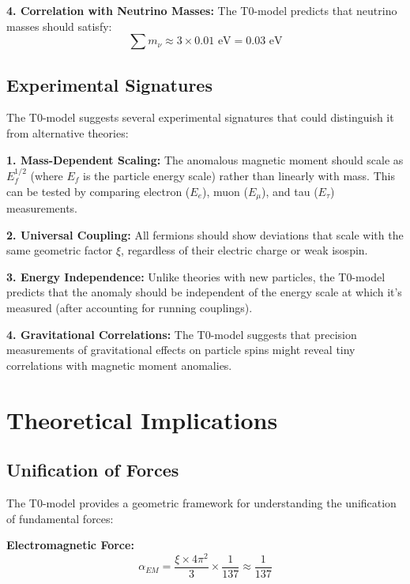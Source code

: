 \documentclass[12pt,a4paper]{article}
\newcommand{\xigeom}{\xi}
\newcommand{\Ee}{E_e}
\newcommand{\Emu}{E_{\mu}}
\begin{document}
	\textbf{4. Correlation with Neutrino Masses:}
	The T0-model predicts that neutrino masses should satisfy:
	\begin{equation}
		\sum m_\nu \approx 3 \times 0.01 \text{ eV} = 0.03 \text{ eV}
	\end{equation}
	
	\subsection{Experimental Signatures}
	
	The T0-model suggests several experimental signatures that could distinguish it from alternative theories:
	
	\textbf{1. Mass-Dependent Scaling:}
	The anomalous magnetic moment should scale as $E_f^{1/2}$ (where $E_f$ is the particle energy scale) rather than linearly with mass. This can be tested by comparing electron ($\Ee$), muon ($\Emu$), and tau ($E_\tau$) measurements.
	
	\textbf{2. Universal Coupling:}
	All fermions should show deviations that scale with the same geometric factor $\xigeom$, regardless of their electric charge or weak isospin.
	
	\textbf{3. Energy Independence:}
	Unlike theories with new particles, the T0-model predicts that the anomaly should be independent of the energy scale at which it's measured (after accounting for running couplings).
	
	\textbf{4. Gravitational Correlations:}
	The T0-model suggests that precision measurements of gravitational effects on particle spins might reveal tiny correlations with magnetic moment anomalies.
	
	\section{Theoretical Implications}
	
	\subsection{Unification of Forces}
	
	The T0-model provides a geometric framework for understanding the unification of fundamental forces:
	
	\textbf{Electromagnetic Force:}
	\begin{equation}
		\alpha_{EM} = \frac{\xigeom \times 4\pi^2}{3} \times \frac{1}{137} \approx \frac{1}{137}
	\end{equation}
	
\end{document}
